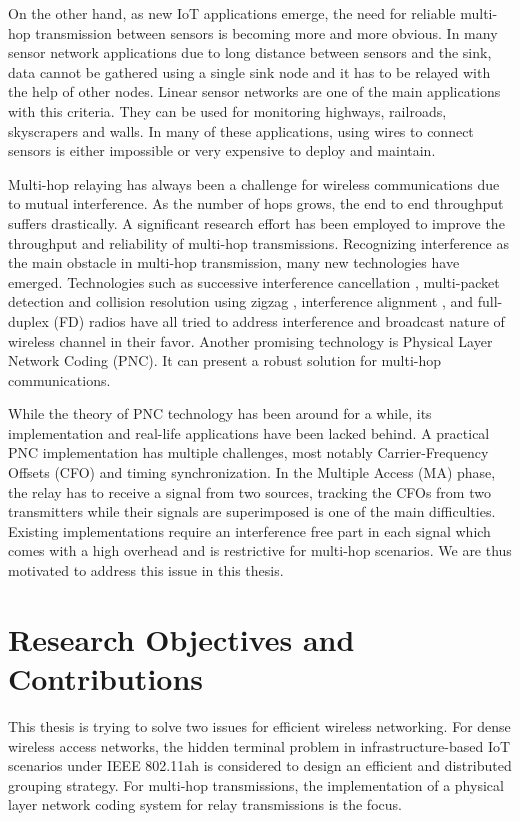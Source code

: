 On the other hand, as new IoT applications emerge, the need for reliable multi-hop transmission between sensors is becoming more and more obvious. In many sensor network applications due to long distance between sensors and the sink, data cannot be gathered using a single sink node and it has to be relayed with the help of other nodes. Linear sensor networks are one of the main applications with this criteria. They can be used for monitoring highways, railroads, skyscrapers and walls. In many of these applications, using wires to connect sensors is either impossible or very expensive to deploy and maintain.

Multi-hop relaying has always been a challenge for wireless communications due to mutual interference. As the number of hops grows, the end to end throughput suffers drastically. A significant research effort has been employed to improve the throughput and reliability of multi-hop transmissions. Recognizing interference as the main obstacle in multi-hop transmission, many new technologies have emerged. Technologies such as successive interference cancellation \cite{alvandi2015delay}, multi-packet detection and collision resolution using zigzag \cite{mzig}, interference alignment \cite{4567443, 7218598}, and full-duplex (FD) radios \cite{fullduplex} have all tried to address interference and broadcast nature of wireless channel in their favor. Another promising technology is Physical Layer Network Coding (PNC). It can present a robust solution for multi-hop communications.


While the theory of PNC technology has been around for a while, its implementation and real-life applications have been lacked behind. A practical PNC implementation has multiple challenges, most notably Carrier-Frequency Offsets (CFO) and timing synchronization. In the Multiple Access (MA) phase, the relay has to receive a signal from two sources, tracking the CFOs from two transmitters while their signals are superimposed is one of the main difficulties. Existing implementations require an interference free part in each signal which comes with a high overhead and is restrictive for multi-hop scenarios. We are thus motivated to address this issue in this thesis.
 

\section{Research Objectives and Contributions}
This thesis is trying to solve two issues for efficient wireless networking. For dense wireless access networks, the hidden terminal problem in infrastructure-based IoT scenarios under IEEE 802.11ah is considered to design an efficient and distributed grouping strategy. For multi-hop transmissions, the implementation of a physical layer network coding system for relay transmissions is the focus.

